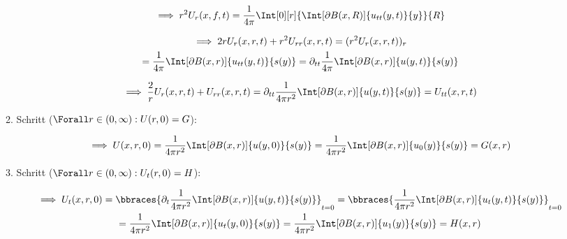 \begin{solution}
\begin{enumerate}[label = \arabic*.]
\begin{enumerate}[label = 1.\arabic*.]
        \begin{align*}
            \implies
            r^2 U_r(x, f, t)
            =
            \frac{1}{4 \pi}
            \Int[0][r]
            {
                \Int[\partial B(x, R)]{u_{tt}(y, t)}{y}
            }{R}
        \end{align*}
    
        \begin{multline*}
            \implies
            2 r U_r(x, r, t) + r^2 U_{rr}(x, r, t)
            =
            (r^2 U_r(x, r, t))_r \\
            =
            \frac{1}{4 \pi}
            \Int[\partial B(x, r)]{u_{tt}(y, t)}{s(y)}
            =
            \partial_{tt}
            \frac{1}{4 \pi}
            \Int[\partial B(x, r)]{u(y, t)}{s(y)}
        \end{multline*}
    
        \begin{align*}
            \implies
            \frac{2}{r}
            U_r(x, r, t) + U_{rr}(x, r, t)
            =
            \partial_{tt}
            \frac{1}{4 \pi r^2}
            \Int[\partial B(x, r)]{u(y, t)}{s(y)}
            =
            U_{tt}(x, r, t)
        \end{align*}

        \item Schritt ($\Forall r \in (0, \infty): U(r, 0) = G$):
        
        \begin{align*}
            \implies
            U(x, r, 0)
            =
            \frac{1}{4 \pi r^2}
            \Int[\partial B(x, r)]{u(y, 0)}{s(y)}
            =
            \frac{1}{4 \pi r^2}
            \Int[\partial B(x, r)]{u_0(y)}{s(y)}
            =
            G(x, r)
        \end{align*}

        \item Schritt ($\Forall r \in (0, \infty): U_t(r, 0) = H$):
        
        \begin{multline*}
            \implies
            U_t(x, r, 0)
            =
            \bbraces
            {
                \partial_t
                \frac{1}{4 \pi r^2}
                \Int[\partial B(x, r)]{u(y, t)}{s(y)}
            }_{t = 0}
            =
            \bbraces
            {
                \frac{1}{4 \pi r^2}
                \Int[\partial B(x, r)]{u_t(y, t)}{s(y)}
            }_{t = 0} \\
            =
            \frac{1}{4 \pi r^2}
            \Int[\partial B(x, r)]{u_t(y, 0)}{s(y)}
            =
            \frac{1}{4 \pi r^2}
            \Int[\partial B(x, r)]{u_1(y)}{s(y)}
            =
            H(x, r)
        \end{multline*}


\end{enumerate}
\end{enumerate}
\end{solution}
